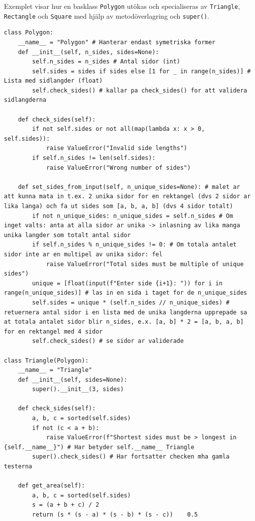 \documentclass[10pt,a4paper]{report}
\begin{document}
Exemplet visar hur en basklass \texttt{Polygon} utökas och specialiseras av \texttt{Triangle}, \texttt{Rectangle} och \texttt{Square} med hjälp av metodöverlagring och \texttt{super()}.

\begin{lstlisting}
class Polygon:
    __name__ = "Polygon" # Hanterar endast symetriska former
    def __init__(self, n_sides, sides=None):
        self.n_sides = n_sides # Antal sidor (int) 
        self.sides = sides if sides else [1 for _ in range(n_sides)] # Lista med sidlangder (float)
        self.check_sides() # kallar pa check_sides() for att validera sidlangderna

    def check_sides(self):
        if not self.sides or not all(map(lambda x: x > 0, self.sides)):
            raise ValueError("Invalid side lengths")
        if self.n_sides != len(self.sides):
            raise ValueError("Wrong number of sides")

    def set_sides_from_input(self, n_unique_sides=None): # malet ar att kunna mata in t.ex. 2 unika sidor for en rektangel (dvs 2 sidor ar lika langa) och fa ut sides som [a, b, a, b] (dvs 4 sidor totalt)
        if not n_unique_sides: n_unique_sides = self.n_sides # Om inget valts: anta at alla sidor ar unika -> inlasning av lika manga unika langder som totalt antal sidor
        if self.n_sides % n_unique_sides != 0: # Om totala antalet sidor inte ar en multipel av unika sidor: fel
            raise ValueError("Total sides must be multiple of unique sides")
        unique = [float(input(f"Enter side {i+1}: ")) for i in range(n_unique_sides)] # las in en sida i taget for de n_unique_sides
        self.sides = unique * (self.n_sides // n_unique_sides) # retuernera antal sidor i en lista med de unika langderna upprepade sa at totala antalet sidor blir n_sides, e.x. [a, b] * 2 = [a, b, a, b] for en rektangel med 4 sidor 
        self.check_sides() # se sidor ar validerade

class Triangle(Polygon):
    __name__ = "Triangle"
    def __init__(self, sides=None):
        super().__init__(3, sides)

    def check_sides(self):
        a, b, c = sorted(self.sides)
        if not (c < a + b):
            raise ValueError(f"Shortest sides must be > longest in {self.__name__}") # Har betyder self.__name__ Triangle
        super().check_sides() # Har fortsatter checken mha gamla testerna

    def get_area(self):
        a, b, c = sorted(self.sides)
        s = (a + b + c) / 2
        return (s * (s - a) * (s - b) * (s - c))    0.5


\end{lstlisting}
\end{document}
